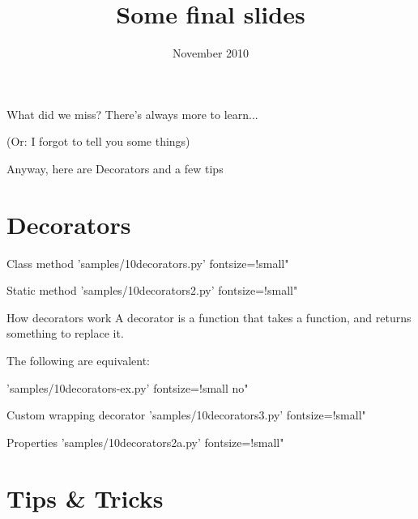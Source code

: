 \documentclass{pyslides}
\title{Some final slides}
\date{November 2010}
\begin{document}
\begin{frame}\titlepage\end{frame}

\section{}

\begin{frame}[fragile]{What did we miss?}
There's always more to learn...

\bigskip

(Or: I forgot to tell you some things)

\bigskip

Anyway, here are Decorators and a few tips
\end{frame}

\section{Decorators}

\begin{frame}[fragile]{Class method}
 'samples/10decorators.py' fontsize=!small"
\end{frame}

\begin{frame}[fragile]{Static method}
 'samples/10decorators2.py' fontsize=!small"
\end{frame}

\begin{frame}[fragile]{How decorators work}
A decorator is a function that takes a function, and returns something to replace it.

The following are equivalent:

 'samples/10decorators-ex.py' fontsize=!small no"
\end{frame}

\begin{frame}[fragile]{Custom wrapping decorator}
 'samples/10decorators3.py' fontsize=!small"
\end{frame}

\begin{frame}[fragile]{Properties}
 'samples/10decorators2a.py' fontsize=!small"
\end{frame}

\section{Tips \& Tricks}
\end{document}
